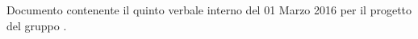 Documento contenente il quinto verbale interno del 01 Marzo 2016 per il progetto \progetto{} del gruppo \gruppo{}.
